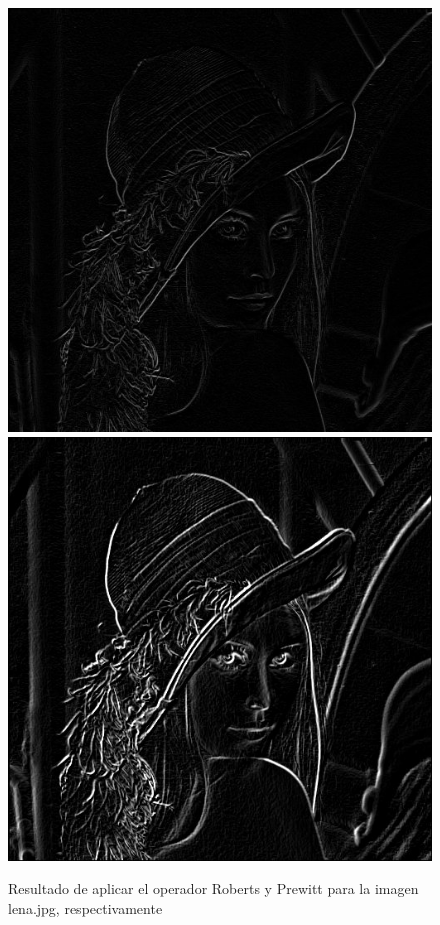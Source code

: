 \documentclass[11pt, a4paper]{article}
\begin{document}
\begin{figure}[ht] %
\centering
\includegraphics[scale=0.30]{roberts.jpg}\hspace{1cm}
\includegraphics[scale=0.30]{prewitt.jpg}
\caption{Resultado de aplicar el operador Roberts y Prewitt para la imagen lena.jpg, respectivamente}
\end{figure}
\end{document}

